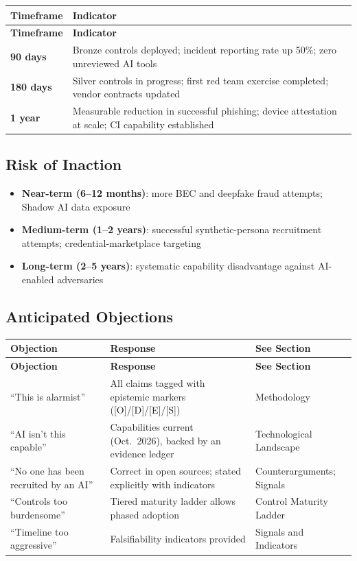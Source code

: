 \documentclass[11pt,letterpaper]{article}
\begin{document}
{\small
\begin{longtable}{L{3cm}L{10cm}}
\toprule
\textbf{Timeframe} & \textbf{Indicator} \\
\midrule
\endfirsthead
\toprule
\textbf{Timeframe} & \textbf{Indicator} \\
\midrule
\endhead
\textbf{90 days} & Bronze controls deployed; incident reporting rate up 50\%; zero unreviewed AI tools \\*
\textbf{180 days} & Silver controls in progress; first red team exercise completed; vendor contracts updated \\*
\textbf{1 year} & Measurable reduction in successful phishing; device attestation at scale; CI capability established \\
\bottomrule
\end{longtable}}

\subsection*{Risk of Inaction}

\begin{itemize}
  \item \textbf{Near-term (6--12 months)}: more BEC and deepfake fraud attempts; Shadow AI data exposure
  \item \textbf{Medium-term (1--2 years)}: successful synthetic-persona recruitment attempts; credential-marketplace targeting
  \item \textbf{Long-term (2--5 years)}: systematic capability disadvantage against AI-enabled adversaries
\end{itemize}

\subsection*{Anticipated Objections}

{\small
\begin{longtable}{L{3cm}L{6cm}L{3.5cm}}
\toprule
\textbf{Objection} & \textbf{Response} & \textbf{See Section} \\
\midrule
\endfirsthead
\toprule
\textbf{Objection} & \textbf{Response} & \textbf{See Section} \\
\midrule
\endhead
``This is alarmist'' & All claims tagged with epistemic markers ([O]/[D]/[E]/[S]) & Methodology \\*
``AI isn't this capable'' & Capabilities current (Oct.\ 2026), backed by an evidence ledger & Technological Landscape \\
``No one has been recruited by an AI'' & Correct in open sources; stated explicitly with indicators & Counterarguments; Signals \\
``Controls too burdensome'' & Tiered maturity ladder allows phased adoption & Control Maturity Ladder \\*
``Timeline too aggressive'' & Falsifiability indicators provided & Signals and Indicators \\
\bottomrule
\end{longtable}}
\end{document}
